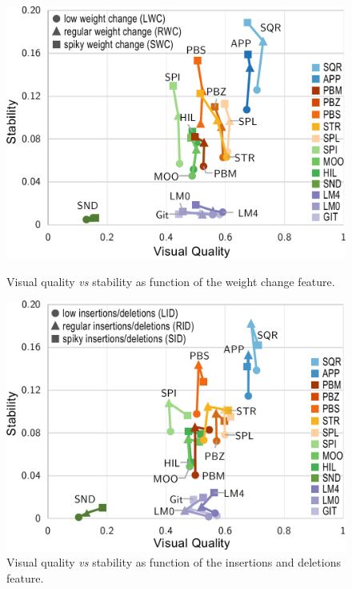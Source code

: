 \begin{figure}[t]
\begin{minipage}{0.475\textwidth}
  \centering
    \includegraphics[width=\linewidth]{figures/treemap-evaluation/WeightChangePlot}
    \caption{Visual quality \emph{vs} stability as function of the weight change feature.}
    \label{fig:weightChange}
\end{minipage}
\hfill
\begin{minipage}{0.475\textwidth}
\centering
    \centering
    \includegraphics[width=\linewidth]{figures/treemap-evaluation/insertionsDeletionsPlot}
    \caption{Visual quality \emph{vs} stability as function of the insertions and deletions feature.}
    \label{fig:insertionsDeletions}
\end{minipage}
\end{figure}

